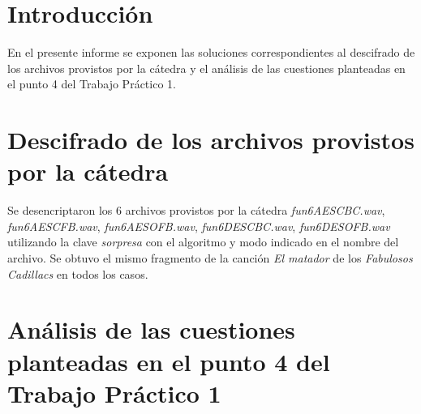 \documentclass[a4paper,10pt]{article}
\author
{
	Pablo Giorgi,
	Santiago Perez De Rosso,
	Luciano Zemin
}
\date{Abril 2011}
\title{\articleTitle}
\begin{document}

\maketitle

\tableofcontents

\section{Introducción}

En el presente informe se exponen las soluciones correspondientes al descifrado
de los archivos provistos por la c\'atedra y el an\'alisis de las cuestiones
planteadas en el punto 4 del Trabajo Pr\'actico 1.

\section{Descifrado de los archivos provistos por la c\'atedra}

Se desencriptaron los 6 archivos provistos por la c\'atedra
\emph{fun6AESCBC.wav}, \emph{fun6AESCFB.wav}, \emph{fun6AESOFB.wav},
\emph{fun6DESCBC.wav}, \emph{fun6DESOFB.wav} utilizando la clave \emph{sorpresa}
con el algoritmo y modo indicado en el nombre del archivo. Se obtuvo
el mismo fragmento de la canción \emph{El matador} de los \emph{Fabulosos Cadillacs}
en todos los casos.

\section{An\'alisis de las cuestiones planteadas en el punto 4 del Trabajo Pr\'actico 1}
\end{document}
